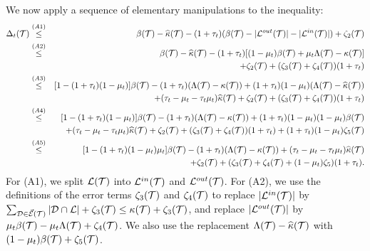 \documentclass{acmsmall}
\newcommand{\cD}{{\cal D}}
\newcommand{\cE}{{\cal E}}
\newcommand{\cL}{{\cal L}}
\newcommand{\cT}{{\cal T}}
\newcommand{\kappaest}{\widehat{\kappa}}
\newcommand{\errorterm}{\zeta}
\begin{document}
%
%
%
We now apply a sequence of elementary manipulations to the inequality:
\begin{eqnarray*}
\nonumber
\Delta_t(\cT) & \stackrel{(A1)}{\leq} & \beta(\cT) -  \kappaest(\cT) - (1+\tau_t) (\beta(\cT) -  |\cL^{out}(\cT)| - |\cL^{in}(\cT)|)  +\errorterm_2(\cT)\\
& \stackrel{(A2)} {\leq} & \beta(\cT) -  \kappaest(\cT) - (1+\tau_t) [(1-\mu_t)\beta(\cT) + \mu_t\Lambda(\cT) -\kappa(\cT)] \\
& & +\errorterm_2(\cT)+ (\errorterm_3(\cT) + \errorterm_4(\cT))(1+\tau_t) \\
& \stackrel{(A3)}{\leq} & [1 - (1+\tau_t)(1-\mu_t)]\beta(\cT) - (1+\tau_t)(\Lambda(\cT)-\kappa(\cT)) + (1+\tau_t)(1-\mu_t)(\Lambda(\cT) -\kappaest(\cT))\\
& &+(\tau_t-\mu_t-\tau_t\mu_t)\kappaest(\cT) +\errorterm_2(\cT)+ (\errorterm_3(\cT) + \errorterm_4(\cT))(1+\tau_t) \\
& \stackrel{(A4)}{\leq} & [1 - (1+\tau_t)(1-\mu_t)]\beta(\cT) - (1+\tau_t)(\Lambda(\cT)-\kappa(\cT)) + (1+\tau_t)(1-\mu_t)(1-\mu_t)\beta(\cT) \\
& & +(\tau_t-\mu_t-\tau_t\mu_t)\kappaest(\cT)+\errorterm_2(\cT)+ (\errorterm_3(\cT) + \errorterm_4(\cT))(1+\tau_t) + (1+\tau_t)(1-\mu_t)\errorterm_5(\cT) \\
& \stackrel{(A5)}{\leq} & [1-(1+\tau_t)(1-\mu_t)\mu_t]\beta(\cT) - (1+\tau_t)(\Lambda(\cT)-\kappa(\cT))+(\tau_t-\mu_t-\tau_t\mu_t)\kappaest(\cT)\\
& & + \errorterm_2(\cT)+(\errorterm_3(\cT)+\errorterm_4(\cT)+(1-\mu_t)\errorterm_5)(1+\tau_t).
\end{eqnarray*}
For (A1), we split $\cL(\cT)$ into $\cL^{in}(\cT)$ and $\cL^{out}(\cT)$.
For (A2), we use the definitions of the error terms $\errorterm_3(\cT)$ and $\errorterm_4(\cT)$
to  replace $|\cL^{in}(\cT)|$ by $\sum_{\cD \in \vec{\cE}(\cT)} |\cD \cap \cL| + \errorterm_3(\cT) \leq 
 \kappa(\cT) + \errorterm_3(\cT)$, and replace
$|\cL^{out}(\cT)|$ by $\mu_t\beta(\cT) - \mu_t\Lambda(\cT) + \errorterm_4(\cT)$.
We also use the replacement $\Lambda(\cT) - \kappaest(\cT)$ with $(1-\mu_t)\beta(\cT) + \errorterm_5(\cT)$. 
\end{document}

